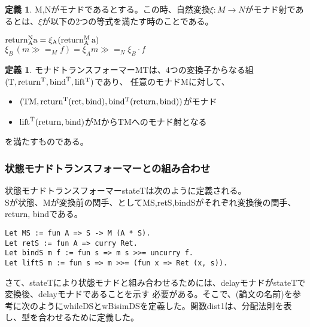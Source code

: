 \documentclass[japanese]{jssst_ppl}
\theoremstyle{definition}
\newtheorem{definition}[theorem]{定義}
\newcommand{\bind}{\rm{bind}}
\newcommand{\ret}{\rm{return}}
\newcommand{\binds}{ \gg = }
\begin{document}
  \begin{definition}
    M,Nがモナドであるとする。この時、自然変換$\xi: M \to N$がモナド射であるとは、$\xi$が以下の2つの等式を満たす時のことである。
    \begin{center}
      $ \ret_A^N a = \xi_A (\ret_A^M \, a)$ \\
      $ \xi_B \,(m \binds_M f) = \xi_A m \binds_N \xi_B \cdot f $ \\
    \end{center}
  \end{definition}

  \begin{definition}
    モナドトランスフォーマーMTは、4つの変換子からなる組$(\text{T},\ret^T,\bind^T,lift^T)$であり、
    任意のモナドMに対して、
    \begin{itemize}
      \item $(\text{TM}, \ret^T(ret, \bind), bind^T(\ret,\bind))$がモナド
      \item $\text{lift}^\text{T}(\ret,\bind)$がMからTMへのモナド射となる
    \end{itemize}
    を満たすものである。
  \end{definition}

\fi
\subsubsection{状態モナドトランスフォーマーとの組み合わせ}
状態モナドトランスフォーマーstateTは次のように定義される。\\
Sが状態、Mが変換前の関手、としてMS,retS,bindSがそれぞれ変換後の関手、return, bindである。

\begin{verbatim}
Let MS := fun A => S -> M (A * S).
Let retS := fun A => curry Ret.
Let bindS m f := fun s => m s >>= uncurry f.
Let liftS m := fun s => m >>= (fun x => Ret (x, s)).
        \end{verbatim}

さて、stateTにより状態モナドと組み合わせるためには、delayモナドがstateTで変換後、delayモナドであることを示す
必要がある。そこで、(論文の名前)を参考に次のようにwhileDSとwBisimDSを定義した。関数dist1は、分配法則を表し、型を合わせるために定義した。
\iffalse
  そこで、次の定理を用いた。\\

  随伴にcurryとuncurryを

  特に状態モナドが随伴$(- \otimes A) \vdash (A \rightarrow - )$から導出されるため次のように
  while operatorとwBisimを定義した。関数dist1は、分配法則を表し、型を合わせるために定義した。
\fi
\end{document}
